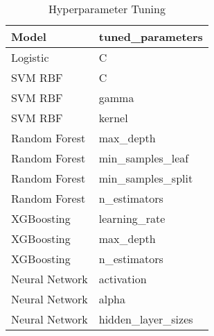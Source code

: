 \begin{table}
\caption{Hyperparameter Tuning}
\label{tab:hyperparam}
\begin{tabular}{ll}
\toprule
Model & tuned\_parameters \\
\midrule
Logistic & C \\
SVM RBF & C \\
SVM RBF & gamma \\
SVM RBF & kernel \\
Random Forest & max_depth \\
Random Forest & min_samples_leaf \\
Random Forest & min_samples_split \\
Random Forest & n_estimators \\
XGBoosting & learning_rate \\
XGBoosting & max_depth \\
XGBoosting & n_estimators \\
Neural Network & activation \\
Neural Network & alpha \\
Neural Network & hidden_layer_sizes \\
\bottomrule
\end{tabular}
\end{table}
